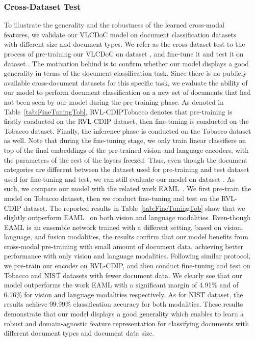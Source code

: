 \documentclass[preprint,review,12pt]{elsarticle}
\begin{document}
\subsubsection{Cross-Dataset Test}
To illustrate the generality and the robustness of the learned cross-modal features, we validate our VLCDoC model on document classification datasets with different size and document types. We refer as the cross-dataset test to the process of pre-training our VLCDoC on dataset , and fine-tune it and test it on dataset . The motivation behind is to confirm whether our model displays a good generality in terms of the document classification task. Since there is no publicly available cross-document datasets for this specific task, we evaluate the ability of our model to perform document classification on a new set of documents that had not been seen by our model during the pre-training phase. As denoted in Table~\ref{tab:FineTuningTob}, RVL-CDIPTobacco denotes that pre-training is firstly conducted on the RVL-CDIP dataset, then fine-tuning is conducted on the Tobacco dataset. Finally, the inference phase is conducted on the Tobacco dataset as well. Note that during the fine-tuning stage, we only train linear classifiers on top of the final embeddings of the pre-trained vision and language encoders, with the parameters of the rest of the layers freezed. Thus, even though the document categories are different between the dataset  used for pre-training and test dataset  used for fine-tuning and test, we can still evaluate our model on dataset . As such, we compare our model with the related work EAML~\cite{bakkali2021eaml}. We first pre-train the model on Tobacco dataset, then we conduct fine-tuning and test on the RVL-CDIP dataset. The reported results in Table~\ref{tab:FineTuningTob} show that we slightly outperform EAML~\cite{bakkali2021eaml} on both vision and language modalities. Even-though EAML is an ensemble network trained with a different setting, based on vision, language, and fusion modalities, the results confirm that our model benefits from cross-modal pre-training with small amount of document data, achieving better performance with only vision and language modalities. 
Following similar protocol, we pre-train our encoder on RVL-CDIP, and then conduct fine-tuning and test on Tobacco and NIST datasets with fewer document data. We clearly see that our model outperforms the work EAML with a significant margin of 4.91\% and of 6.16\% for vision and language modalities respectively. As for NIST dataset, the results achieve 99.99\% classification accuracy for both modalities. These results demonstrate that our model displays a good generality which enables to learn a robust and domain-agnostic feature representation for classifying documents with different document types and document data size.
\end{document}
